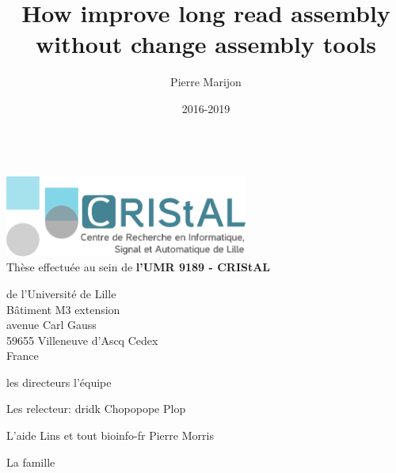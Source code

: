 \documentclass{thesis}
\title{How improve long read assembly without change assembly tools} %
\author{Pierre Marijon}
\date{2016-2019}
\newcommand{\onlyinsubfile}[1]{#1}
\newcommand{\notinsubfile}[1]{}
\begin{document}
\renewcommand{\onlyinsubfile}[1]{}
\renewcommand{\notinsubfile}[1]{#1}

\maketitle
\clearpage

\listoftodos

\begin{center}
~\vspace*{\fill}\\
\thispagestyle{plain}
\includegraphics[width=0.6\textwidth]{assets/images/logo_cristal}\vspace{0.5cm}\\
Thèse effectuée au sein de \textbf{l'UMR 9189 - CRIStAL}\par 
 de l'Université de Lille\\
Bâtiment M3 extension\\
avenue Carl Gauss\\
59655 Villeneuve d'Ascq Cedex\\
France
\vspace*{\fill}
\clearpage
\end{center}

\frontmatter




les directeurs
l'équipe

Les relecteur:
dridk
Chopopope
Plop

L'aide 
Lins et tout bioinfo-fr
Pierre Morris

La famille

\tableofcontents

\mainmatter












\notinsubfile{


}
\end{document}
